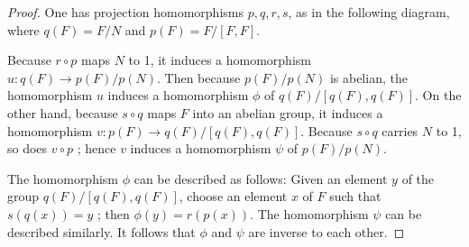 \begin{proof}
	One has projection homomorphisms \(p,q,r,s\), as in the following diagram, where \(q( F) = F/N\) and \(p( F) = F/[ {F,F}]\).
\par\nopagebreak
\begin{center}
	\munkrescomm{0.5603}{%
		\node (F)  at ( 21.4, -152.5) {$F$};
		\node (qF) at (248.9,  -42.8) {$q(F)$};
		\node (qQ) at (674.1,  -42.8) {$q(F)/[q(F),q(F)]$};
		\node (pF) at (248.9, -259.8) {$p(F)$};   %
		\node (pP) at (735.4, -259.8) {$p(F)/p(N)$};
		\draw[->] (qF) -- node[inner sep=0pt,above=3.5pt,pos=.5] {$s$} (qQ);
		\draw[->] (F)  -- node[inner sep=0pt,above=3.5pt,pos=.5] {$q$} (qF);
		\draw[->] (F)  -- node[inner sep=0pt,below=3.5pt,pos=.5] {$p$} (pF);
		\draw[->] (qF) -- node[inner sep=0pt,below=3.5pt,pos=.22] {$u$} (pP);
		\draw[->] (pF) -- node[inner sep=0pt,below=3.5pt,pos=.22] {$v$} (qQ);
		\draw[->] (737, -68) -- node[inner sep=0pt,left=3pt] {$\phi$} (737, -232);   %
		\draw[->] (767, -232) -- node[inner sep=0pt,right=3pt] {$\psi$} (767, -68);   %
		\draw[->] (pF) -- node[inner sep=0pt,below=3.5pt,pos=.5] {$r$} (pP);
	}
	\label{fig:com_75_1}
\end{center}
\par\nopagebreak 

Because \(r \circ p\) maps \(N\) to 1, it induces a homomorphism \(u : q( F) \rightarrow p( F) /p( N)\). Then because \(p( F) /p( N)\) is abelian, the homomorphism \(u\) induces a homomorphism \(\phi\) of \(q( F) /[ {q( F),q( F) }]\). On the other hand, because \(s \circ q\) maps \(F\) into an abelian group, it induces a homomorphism \(v : p( F) \rightarrow q( F) /[ {q( F),q( F) }]\). Because \(s \circ q\) carries \(N\) to 1, so does \(v \circ p\) ; hence \(v\) induces a homomorphism \(\psi\) of \(p( F) /p( N)\).

The homomorphism \(\phi\) can be described as follows: Given an element \(y\) of the group \(q( F) /[ {q( F),q( F) }]\), choose an element \(x\) of \(F\) such that \(s( {q(x) }) = y\) ; then \(\phi ( y) = r( {p(x) })\). The homomorphism \(\psi\) can be described similarly. It follows that \(\phi\) and \(\psi\) are inverse to each other.
\end{proof}
